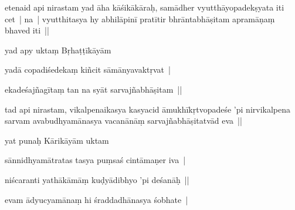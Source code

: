 \documentclass[article,12pt,a4paper]{memoir}%
\newcounter{parCount}
\begin{document}
	  
	  \pstart \leavevmode%
	\label{thakur75-24.13}etenaid api nirastam yad āha kāśikākāraḥ, samādher vyutthāyopadekṣyata iti cet | na | vyutthitasya hy abhilāpinī pratītir bhrāntabhāṣitam apramāṇaṃ bhaved iti || 
	{}
	\pend%
      

	  
	  \pstart \leavevmode%
	\label{thakur75-24.15}yad apy uktaṃ Bṛhaṭṭīkāyām 
	{}
	\pend%
      

	  
	  \pstart \leavevmode%
	yadā copadiśedekaṃ kiñcit sāmānyavaktṛvat | 
	{}
	\pend%
      

	  
	  \pstart \leavevmode%
	ekadeśajñagītaṃ tan na syāt sarvajñabhāṣitam ||
	{}
	\pend%
      

	  
	  \pstart \leavevmode%
	tad api nirastam, vikalpenaikasya kasyacid āmukhīkṛtvopadeśe 'pi nirvikalpena sarvam avabudhyamānasya vacanānāṃ sarvajñabhāṣitatvād eva || 
	{}
	\pend%
      

	  
	  \pstart \leavevmode%
	yat punaḥ Kārikāyām uktam 
	{}
	\pend%
      

	  
	  \pstart \leavevmode%
	sānnidhyamātratas tasya puṃsaś cintāmaṇer iva | 
	{}
	\pend%
      

	  
	  \pstart \leavevmode%
	niścaranti yathākāmāṃ kuḍyādibhyo 'pi deśanāḥ || 
	{}
	\pend%
      

	  
	  \pstart \leavevmode%
	evam ādyucyamānaṃ hi śraddadhānasya śobhate | 
	{}
	\pend%
      
\end{document}
